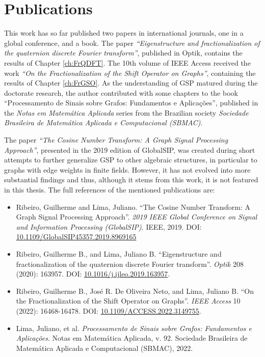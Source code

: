 \section{Publications}

This work has so far published two papers in international journals, one in a global conference, and a book. The paper \textit{``Eigenstructure and fractionalization of the quaternion discrete Fourier transform''}, published in Optik, contains the results of Chapter \ref{ch:FrQDFT}. The 10th volume of IEEE Access received the work \textit{``On the Fractionalization of the Shift Operator on Graphs''}, containing the results of Chapter \ref{ch:FrGSO}. As the understanding of GSP matured during the doctorate research, the author contributed with some chapters to the book ``Processamento de Sinais sobre Grafos: Fundamentos e Aplica{\c c}{\~o}es'', published in the \textit{Notas em Matem\'atica Aplicada} series from the Brazilian society \textit{Sociedade Brasileira de Matemática Aplicada e Computacional (SBMAC)}.

The paper \emph{``The Cosine Number Transform: A Graph Signal Processing Approach''}, presented in the 2019 edition of GlobalSIP, was created during short attempts to further generalize GSP to other algebraic structures, in particular to graphs with edge weights in finite fields. However, it has not evolved into more substantial findings and thus, although it stems from this work, it is not featured in this thesis. The full references of the mentioned publications are:

\begin{itemize}[noitemsep]
\item Ribeiro, Guilherme and Lima, Juliano. ``The Cosine Number Transform: A Graph Signal Processing Approach''. \textit{2019 IEEE Global Conference on Signal and Information Processing (GlobalSIP)}. IEEE, 2019. DOI: \href{https://doi.org/10.1109/GlobalSIP45357.2019.8969165}{10.1109/GlobalSIP45357.2019.8969165}

\item Ribeiro, Guilherme B., and Lima, Juliano B. ``Eigenstructure and fractionalization of the quaternion discrete Fourier transform''. \textit{Optik} 208 (2020): 163957. DOI: \href{https://doi.org/10.1016/j.ijleo.2019.163957}{10.1016/j.ijleo.2019.163957}.

\item Ribeiro, Guilherme B., José R. De Oliveira Neto, and Lima, Juliano B. ``On the Fractionalization of the Shift Operator on Graphs''. \textit{IEEE Access} 10 (2022): 16468-16478. DOI: \href{https://doi.org/10.1109/ACCESS.2022.3149755}{10.1109/ACCESS.2022.3149755}.

\item Lima, Juliano, et al. \textit{Processamento de Sinais sobre Grafos: Fundamentos e Aplica{\c c}{\~o}es}. Notas em Matem\'atica Aplicada, v. 92. Sociedade Brasileira de Matemática Aplicada e Computacional (SBMAC), 2022.
\end{itemize}


